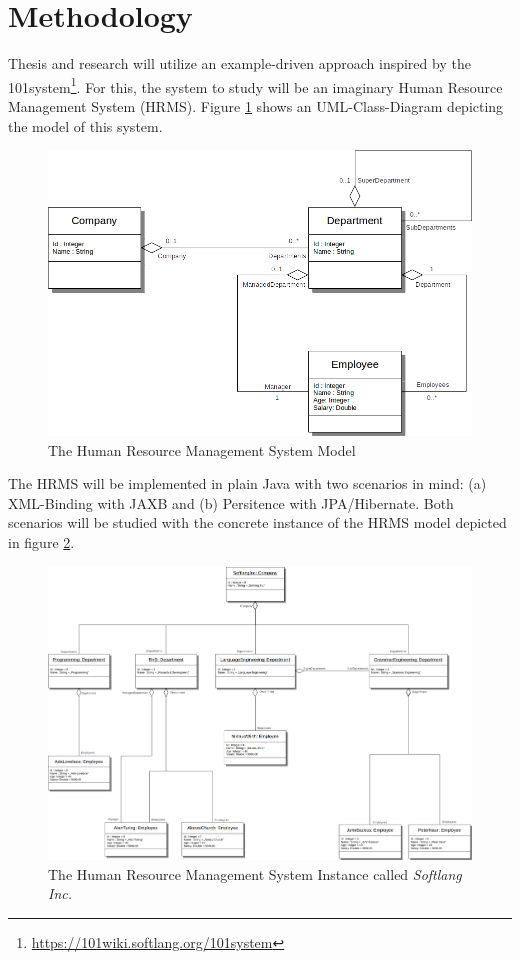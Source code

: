\documentclass[runningheads,a4paper]{llncs}
\newcommand{\footnoteurl}[1]{\footnote{\url{#1}}}
\begin{document}
\section{Methodology}
\label{section:Methodology}
Thesis and research will utilize an example-driven approach inspired by the 101system\footnoteurl{https://101wiki.softlang.org/101system}.
For this, the system to study will be an imaginary Human Resource Management System (HRMS).
Figure \ref{figure:TheCompanyModel} shows an UML-Class-Diagram depicting the model of this system.

\begin{figure}[h!]
\centering
\includegraphics[width=\textwidth]{companies.png}
\caption{The Human Resource Management System Model}
\label{figure:TheCompanyModel}
\end{figure}

The HRMS will be implemented in plain Java with two scenarios in mind:
(a) XML-Binding with JAXB
and (b) Persitence with JPA/Hibernate.
Both scenarios will be studied with the concrete instance of the HRMS model depicted in figure \ref{figure:TheCompanyInstanceCalledSoftlangInc}.

\begin{figure}[h!]
\centering
\includegraphics[width=\textwidth]{softlanginc.png}
\caption{The Human Resource Management System Instance called \textit{Softlang Inc.}}
\label{figure:TheCompanyInstanceCalledSoftlangInc}
\end{figure}
\end{document}

